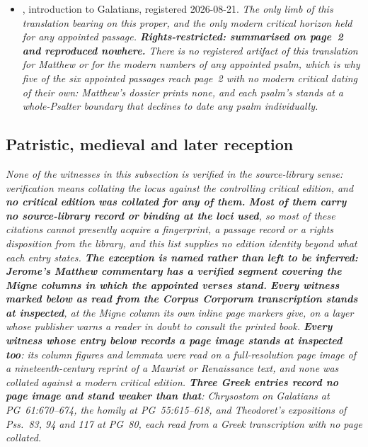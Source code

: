\begin{itemize}[leftmargin=1.2em, itemsep=0.15em]
{uncorrected optical text, expressly not textual control, and carries no passage
at this locus, so it cannot lift the limit.}
\item {}, introduction to Galatians,
registered 2026-08-21. \textit{The only limb of this translation bearing on
this proper, and the only modern critical horizon held for any appointed
passage. \textbf{Rights-restricted: summarised on page~2 and reproduced
nowhere.} There is no registered artifact of this translation for Matthew or
for the modern numbers of any appointed psalm, which is why five of the six
appointed passages reach page~2 with no modern critical dating of their own:
Matthew's dossier prints none, and each psalm's stands at a whole-Psalter
boundary that declines to date any psalm individually.}
\end{itemize}

\subsection*{Patristic, medieval and later reception}

\textit{None of the witnesses in this subsection is \emph{verified} in the
source-library sense: verification means collating the locus against the
controlling critical edition, and \textbf{no critical edition was collated for
any of them.} \textbf{Most of them carry no source-library record or binding at
the loci used}, so most of these citations cannot presently acquire a
fingerprint, a passage record or a rights disposition from the library, and this
list supplies no edition identity beyond what each entry states. \textbf{The
exception is named rather than left to be inferred: Jerome's Matthew commentary
has a verified segment covering the Migne columns in which the appointed verses
stand.} \textbf{Every witness marked
below as read from the Corpus Corporum  transcription
stands at \emph{inspected}}, at the Migne column its own inline page markers
give, on a layer whose publisher warns a reader in doubt to consult the printed
book. \textbf{Every witness whose entry below records a  page
image stands at \emph{inspected} too}: its column figures and lemmata were read
on a full-resolution page image of a nineteenth-century reprint of a Maurist or
Renaissance text, and none was collated against a modern critical edition.
\textbf{Three Greek entries record no page image and stand weaker than that}:
Chrysostom on Galatians at PG~61:670--674, the homily  at
PG~55:615--618, and Theodoret's expositions of Pss.~83, 94 and 117 at PG~80,
each read from a Greek transcription with no  page
collated.}


